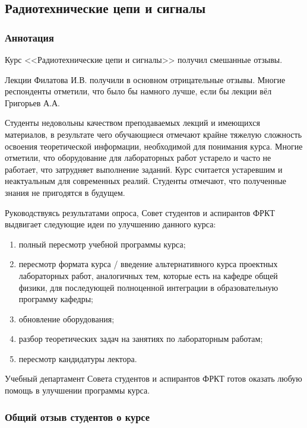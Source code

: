 \subsection{Радиотехнические цепи и сигналы}
	
	\subsubsection{Аннотация}

        Курс <<Радиотехнические цепи и сигналы>> получил смешанные отзывы.

        Лекции Филатова И.В. получили в основном отрицательные отзывы. Многие респонденты отметили, что было бы намного лучше, если бы лекции вёл Григорьев А.А.

        Студенты недовольны качеством преподаваемых лекций и имеющихся материалов, в результате чего обучающиеся отмечают крайне тяжелую сложность освоения теоретической информации, необходимой для понимания курса. Многие отметили, что оборудование для лабораторных работ устарело и часто не работает, что затрудняет выполнение заданий. Курс считается устаревшим и неактуальным для современных реалий. Студенты отмечают, что полученные знания не пригодятся в будущем.

        Руководствуясь результатами опроса, Совет студентов и аспирантов ФРКТ выдвигает следующие идеи по улучшению данного курса:
        \begin{enumerate}
            \item полный пересмотр учебной программы курса;
            \item пересмотр формата курса / введение альтернативного курса проектных лабораторных работ, аналогичных тем, которые есть на кафедре общей физики, для последующей полноценной интеграции в образовательную программу кафедры;
            \item обновление оборудования;
            \item разбор теоретических задач на занятиях по лабораторным работам;
            \item пересмотр кандидатуры лектора.
        \end{enumerate}

        Учебный департамент Совета студентов и аспирантов ФРКТ готов оказать любую помощь в улучшении программы курса.

	\subsubsection{Общий отзыв студентов о курсе}

